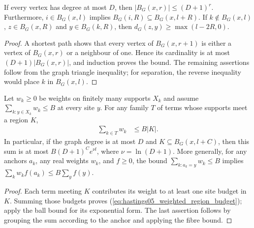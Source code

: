\begin{lemma}
    \label{thm:hastings05_degree_ball}
    \leanok
    If every vertex has degree at most $D$, then
    $|B_G(x,r)|\le(D+1)^r$. Furthermore, $i\in B_G(x,l)$ implies
    $B_G(i,R)\subseteq B_G(x,l+R)$. If $k\notin B_G(x,l)$,
    $z\in B_G(x,R)$ and $y\in B_G(k,R)$, then
    $d_G(z,y)\ge\max(l-2R,0)$.
\end{lemma}
\begin{proof}\leanok
    A shortest path shows that every vertex of $B_G(x,r+1)$ is either
    a vertex of $B_G(x,r)$ or a neighbour of one. Hence its cardinality
    is at most $(D+1)|B_G(x,r)|$, and induction proves the bound.
    The remaining assertions follow from the graph triangle inequality;
    for separation, the reverse inequality would place $k$ in $B_G(x,l)$.
\end{proof}

\begin{lemma}
    \label{thm:hastings05_weighted_region_budget}
    \leanok
    Let $w_k\ge0$ be weights on finitely many supports $X_k$ and assume
    $\sum_{k:y\in X_k}w_k\le B$ at every site $y$. For any family $T$
    of terms whose supports meet a region $K$,
    \begin{align}
        \sum_{k\in T}w_k & \le B|K|.
        \label{eq:hastings05_weighted_region_budget}
    \end{align}
    In particular, if the graph degree is at most $D$ and
    $K\subseteq B_G(x,l+C)$, then this sum is at most
    $B(D+1)^C e^{\nu l}$, where $\nu=\ln(D+1)$.
    More generally, for any anchors $a_k$, any real weights $w_k$,
    and $f\ge0$, the bound $\sum_{k:a_k=y}w_k\le B$ implies
    $\sum_kw_kf(a_k)\le B\sum_yf(y)$.
\end{lemma}
\begin{proof}\leanok
    Each term meeting $K$ contributes its weight to at least one site
    budget in $K$. Summing those budgets proves
    (\ref{eq:hastings05_weighted_region_budget}); apply the ball bound
    for its exponential form. The last assertion follows by grouping
    the sum according to the anchor and applying the fibre bound.
\end{proof}

